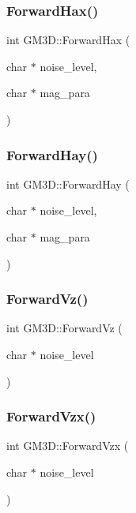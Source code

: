 \subsubsection{\texorpdfstring{ForwardHax()}{ForwardHax()}}
{\footnotesize\ttfamily int G\+M3\+D\+::\+Forward\+Hax (\begin{DoxyParamCaption}\item[{char $\ast$}]{noise\+\_\+level,  }\item[{char $\ast$}]{mag\+\_\+para }\end{DoxyParamCaption})}

\mbox{\label{class_g_m3_d_a6af0750cb63017973704f70ffd9553d1}} 
\subsubsection{\texorpdfstring{ForwardHay()}{ForwardHay()}}
{\footnotesize\ttfamily int G\+M3\+D\+::\+Forward\+Hay (\begin{DoxyParamCaption}\item[{char $\ast$}]{noise\+\_\+level,  }\item[{char $\ast$}]{mag\+\_\+para }\end{DoxyParamCaption})}

\mbox{\label{class_g_m3_d_a22850b3775f11e04af527f63387e750e}} 
\subsubsection{\texorpdfstring{ForwardVz()}{ForwardVz()}}
{\footnotesize\ttfamily int G\+M3\+D\+::\+Forward\+Vz (\begin{DoxyParamCaption}\item[{char $\ast$}]{noise\+\_\+level }\end{DoxyParamCaption})}

\mbox{\label{class_g_m3_d_aac2d277383d952d5bc8437c2fcd8cd56}} 
\subsubsection{\texorpdfstring{ForwardVzx()}{ForwardVzx()}}
{\footnotesize\ttfamily int G\+M3\+D\+::\+Forward\+Vzx (\begin{DoxyParamCaption}\item[{char $\ast$}]{noise\+\_\+level }\end{DoxyParamCaption})}

